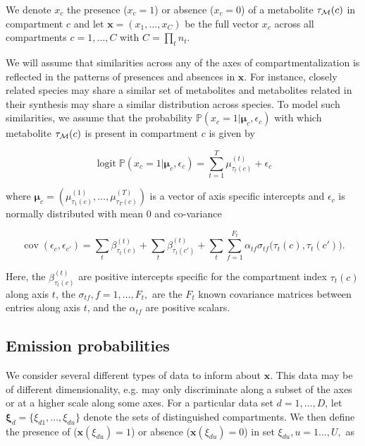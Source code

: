\documentclass[
11pt, %
english, %
singlespacing, %
headsepline, %
chapterinoneline, %
]{MastersDoctoralThesis} %
\DeclareMathOperator{\logit}{logit}
\DeclareMathOperator{\cov}{cov}
\def\P{\mathbb{P}}
\def\x{\boldsymbol{x}}
\def\bmu{\boldsymbol{\mu}}
\def\bxi{\boldsymbol{\xi}}
\def\M{{\cal M}}
\begin{document}
We denote $x_{c}$ the presence ($x_c=1$) or absence ($x_c=0$) of a metabolite $\tau_\M(c)$ in compartment $c$ and let $\x=(x_1, \ldots, x_C)$ be the full vector $x_c$ across all compartments $c=1, \ldots, C$ with $C=\prod_t n_t$.

We will assume that similarities across any of the axes of compartmentalization is reflected in the patterns of presences and absences in $\x$. For instance, closely related species may share a similar set of metabolites and  metabolites related in their synthesis may share a similar distribution across species. To model such similarities, we assume that the probability $\P(x_c=1|\bmu_c, \epsilon_c)$ with which metabolite $\tau_\M(c)$ is present in compartment $c$ is given by

\begin{equation}\label{eq:logit of X}
	\logit \P(x_c=1|\bmu_c, \epsilon_c) = \sum_{t=1}^{T} \mu^{(t)}_{\tau_t(c)} + \epsilon_{c}
\end{equation}

where $\bmu_c=(\mu^{(1)}_{\tau_1(c)}, \ldots, \mu^{(T)}_{\tau_T(c)})$ is a vector of axis specific intercepts and $\epsilon_{c}$ is normally distributed with mean 0 and co-variance

\begin{equation}
	\cov(\epsilon_c, \epsilon_{c'}) = \sum_t \beta^{(t)}_{\tau_t(c)} + \sum_t \beta^{(t)}_{\tau_t(c')} + \sum_t \sum_{f=1}^{F_t} \alpha_{tf} \sigma_{tf}\Big(\tau_t(c), \tau_t(c')\Big).
\end{equation}

Here, the $\beta^{(t)}_{\tau_t(c)}$ are positive intercepts specific for the compartment index $\tau_t(c)$ along axis $t$, the $\sigma_{tf}, f=1, \ldots, F_t,$ are the $F_t$ known covariance matrices between entries along axis $t$, and the $\alpha_{tf}$ are positive scalars.
	
	\subsection{Emission probabilities}\label{subsec:emission probabilities}
	
	We consider several different types of data to inform about $\x$. This data may be of different dimensionality, e.g. may only discriminate along a subset of the axes or at a higher scale along some axes. For a particular data set $d=1, \ldots, D$, let $\bxi_d=\{\xi_{d1}, \ldots, \xi_{du}\}$ denote the sets of distinguished compartments. We then define the presence of ($\x(\xi_{du})=1$) or absence ($\x(\xi_{du})=0$) in set $\xi_{du}, u=1\ldots,U,$ as
	
\end{document}
